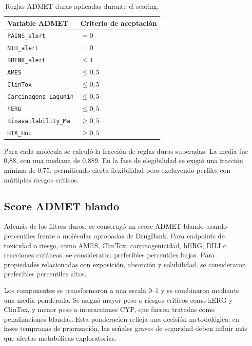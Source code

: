 \documentclass[IB]{TFUOC}%
\begin{document}
\begin{table}[H]
    \centering
    \small
    \begin{tabular}{p{5cm} p{5cm}}
        \hline
        \textbf{Variable ADMET} & \textbf{Criterio de aceptación} \\
        \hline
        \texttt{PAINS\_alert} & $= 0$ \\
        \hline
        \texttt{NIH\_alert} & $= 0$ \\
        \hline
        \texttt{BRENK\_alert} & $\leq 1$ \\
        \hline
        \texttt{AMES} & $\leq 0,5$ \\
        \hline
        \texttt{ClinTox} & $\leq 0,5$ \\
        \hline
        \texttt{Carcinogens\_Lagunin} & $\leq 0,5$ \\
        \hline
        \texttt{hERG} & $\leq 0,5$ \\
        \hline
        \texttt{Bioavailability\_Ma} & $\geq 0,5$ \\
        \hline
        \texttt{HIA\_Hou} & $\geq 0,5$ \\
        \hline
    \end{tabular}
    \caption{Reglas ADMET duras aplicadas durante el scoring.}
    \label{tab:filtros_admet_duros}
\end{table}

Para cada molécula se calculó la fracción de reglas duras superadas. La media fue 0,88, con una mediana de 0,889. En la fase de elegibilidad se exigió una fracción mínima de 0,75, permitiendo cierta flexibilidad pero excluyendo perfiles con múltiples riesgos críticos.

\subsection{Score ADMET blando}

Además de los filtros duros, se construyó un score ADMET blando usando percentiles frente a moléculas aprobadas de DrugBank. Para endpoints de toxicidad o riesgo, como AMES, ClinTox, carcinogenicidad, hERG, DILI o reacciones cutáneas, se consideraron preferibles percentiles bajos. Para propiedades relacionadas con exposición, absorción y solubilidad, se consideraron preferibles percentiles altos.

Los componentes se transformaron a una escala 0--1 y se combinaron mediante una media ponderada. Se asignó mayor peso a riesgos críticos como hERG y ClinTox, y menor peso a interacciones CYP, que fueron tratadas como penalizaciones blandas. Esta ponderación refleja una decisión metodológica: en fases tempranas de priorización, las señales graves de seguridad deben influir más que alertas metabólicas exploratorias.
\end{document}
